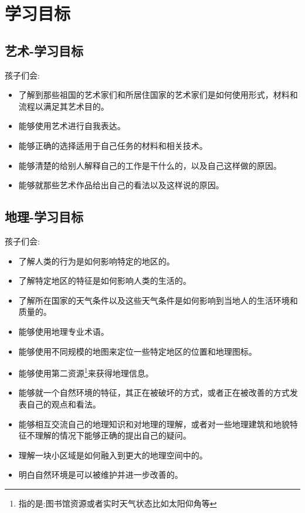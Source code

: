 \chapter{学习目标}
    
\section{艺术-学习目标}   
   孩子们会:  \par
   \begin{itemize}
     \item 了解到那些祖国的艺术家们和所居住国家的艺术家们是如何使用形式，材料和流程以满足其艺术目的。
     \item 能够使用艺术进行自我表达。
     \item 能够正确的选择适用于自己任务的材料和相关技术。
     \item 能够清楚的给别人解释自己的工作是干什么的，以及自己这样做的原因。
     \item 能够就那些艺术作品给出自己的看法以及这样说的原因。
     \end{itemize}  

\section{地理-学习目标}
    孩子们会: \par
    \begin{itemize}
      \item 了解人类的行为是如何影响特定的地区的。
      \item 了解特定地区的特征是如何影响人类的生活的。
      \item 了解所在国家的天气条件以及这些天气条件是如何影响到当地人的生活环境和质量的。
      \item 能够使用地理专业术语。
      \item 能够使用不同规模的地图来定位一些特定地区的位置和地理图标。
      \item 能够使用第二资源\footnote{指的是:图书馆资源或者实时天气状态比如太阳仰角等}来获得地理信息。
      \item 能够就一个自然环境的特征，其正在被破坏的方式，或者正在被改善的方式发表自己的观点和看法。
      \item 能够相互交流自己的地理知识和对地理的理解，或者对一些地理建筑和地貌特征不理解的情况下能够正确的提出自己的疑问。
      \item 理解一块小区域是如何融入到更大的地理空间中的。
      \item 明白自然环境是可以被维护并进一步改善的。
    \end{itemize}

